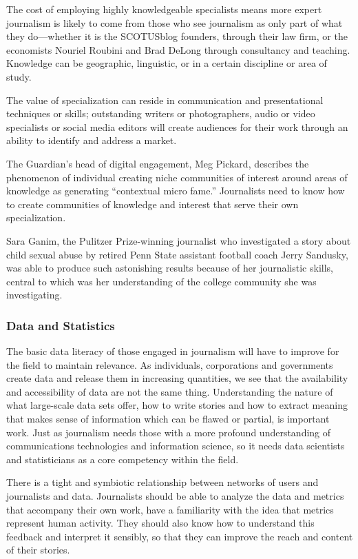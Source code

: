 The cost of employing highly knowledgeable specialists means more expert
journalism is likely to come from those who see journalism as only part of what
they do—whether it is the SCOTUSblog founders, through their law firm, or
the economists Nouriel Roubini and Brad DeLong through consultancy and
teaching. Knowledge can be geographic, linguistic, or in a certain discipline or
area of study.

The value of specialization can reside in communication and presentational techniques
or skills; outstanding writers or photographers, audio or video specialists
or social media editors will create audiences for their work through an ability to
identify and address a market.

The Guardian’s head of digital engagement, Meg Pickard, describes the phenomenon
of individual creating niche communities of interest around areas
of knowledge as generating ``contextual micro fame.'' Journalists need to
know how to create communities of knowledge and interest that serve their
own specialization.

Sara Ganim, the Pulitzer Prize-winning journalist who investigated a story
about child sexual abuse by retired Penn State assistant football coach Jerry Sandusky,
was able to produce such astonishing results because of her journalistic
skills, central to which was her understanding of the college community she
was investigating.

\subsubsection{Data and Statistics}

The basic data literacy of those engaged in journalism will have to improve for
the field to maintain relevance. As individuals, corporations and governments
create data and release them in increasing quantities, we see that the availability
and accessibility of data are not the same thing. Understanding the nature of what
large-scale data sets offer, how to write stories and how to extract meaning that
makes sense of information which can be flawed or partial, is important work.
Just as journalism needs those with a more profound understanding of communications
technologies and information science, so it needs data scientists and
statisticians as a core competency within the field.

There is a tight and symbiotic relationship between networks of users and
journalists and data. Journalists should be able to analyze the data and metrics
that accompany their own work, have a familiarity with the idea that metrics
represent human activity. They should also know how to understand this feedback
and interpret it sensibly, so that they can improve the reach and content
of their stories.

